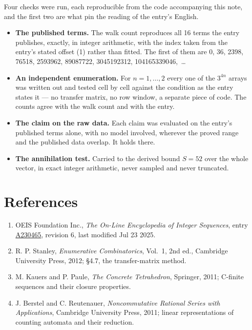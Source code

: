 \documentclass[11pt]{article}
\theoremstyle{definition}
\begin{document}
Four checks were run, each reproducible from the code accompanying this note, and the first two are what pin the reading of the entry's English.

\begin{itemize}

\item {\bfseries The published terms.} The walk count reproduces all 16 terms the entry publishes, exactly, in integer arithmetic, with the index taken from the entry's stated offset (1) rather than fitted. The first of them are 0, 36, 2398, 76518, 2593962, 89087722, 3045192312, 104165339046,~\dots

\item {\bfseries An independent enumeration.} For $n = 1,\dots,2$ every one of the $3^{4n}$ arrays was written out and tested cell by cell against the condition as the entry states it --- no transfer matrix, no row window, a separate piece of code. The counts agree with the walk count and with the entry.

\item {\bfseries The claim on the raw data.} Each claim was evaluated on the entry's published terms alone, with no model involved, wherever the proved range and the published data overlap. It holds there.

\item {\bfseries The annihilation test.} Carried to the derived bound $S = 52$ over the whole vector, in exact integer arithmetic, never sampled and never truncated.

\end{itemize}

\section{References}

\begin{enumerate}

\item OEIS Foundation Inc., \emph{The On-Line Encyclopedia of Integer Sequences}, entry \href{https://oeis.org/A230465}{A230465}, revision 6, last modified Jul 23 2025.

\item R. P. Stanley, \emph{Enumerative Combinatorics}, Vol.~1, 2nd ed., Cambridge University Press, 2012; \S4.7, the transfer-matrix method.

\item M. Kauers and P. Paule, \emph{The Concrete Tetrahedron}, Springer, 2011; C-finite sequences and their closure properties.

\item J. Berstel and C. Reutenauer, \emph{Noncommutative Rational Series with Applications}, Cambridge University Press, 2011; linear representations of counting automata and their reduction.

\end{enumerate}
\end{document}
